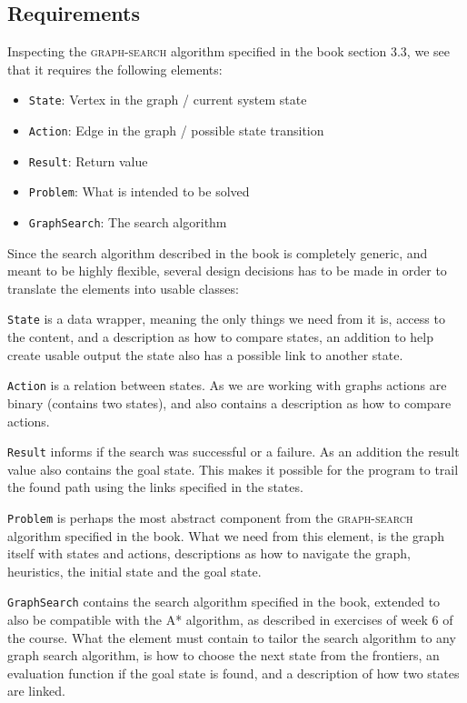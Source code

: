 \subsection{Requirements}

Inspecting the \textsc{graph-search} algorithm specified in the book\cite{ai_text_book} section 3.3, we see that it requires the following elements:
\begin{itemize}
    \item \texttt{State}: Vertex in the graph / current system state
    \item \texttt{Action}: Edge in the graph / possible state transition
    \item \texttt{Result}: Return value
    \item \texttt{Problem}: What is intended to be solved
    \item \texttt{GraphSearch}: The search algorithm
\end{itemize}

Since the search algorithm described in the book is completely generic, and meant to be highly flexible, several design decisions has to be made in order to translate the elements into usable classes:

\texttt{State} is a data wrapper, meaning the only things we need from it is, access to the content, and a description as how to compare states, an addition to help create usable output the state also has a possible link to another state. 

\texttt{Action} is a relation between states. As we are working with graphs actions are binary (contains two states), and also contains a description as how to compare actions.

\texttt{Result} informs if the search was successful or a failure. As an addition the result value also contains the goal state. This makes it possible for the program to trail the found path using the links specified in the states.

\texttt{Problem} is perhaps the most abstract component from the \textsc{graph-search} algorithm specified in the book. What we need from this element, is the graph itself with states and actions, descriptions as how to navigate the graph, heuristics, the initial state and the goal state. 

\texttt{GraphSearch} contains the search algorithm specified in the book, extended to also be compatible with the A* algorithm, as described in exercises of week 6 of the course. What the element must contain to tailor the search algorithm to any graph search algorithm, is how to choose the next state from the frontiers, an evaluation function if the goal state is found, and a description of how two states are linked.

